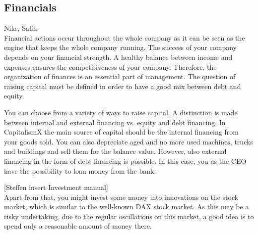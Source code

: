 \subsection{Financials} \label{finance_manual}
Nike, Salih\\

Financial actions occur throughout the whole company as it can be seen as the engine that keeps the whole company running. The success of your company depends on your financial strength. A healthy balance between income and expenses ensures the competitiveness of your company. Therefore, the organization of finances is an essential part of management. The question of raising capital must be defined in order to have a good mix between debt and equity.

You can choose from a variety of ways to raise capital. A distinction is made between internal and external financing vs. equity and debt financing.
In CapitalismX the main source of capital should be the internal financing from your goods sold. You can also depreciate aged and no more used machines, trucks and buildings and sell them for the balance value. However, also external financing in the form of debt financing is possible. In this case, you as the CEO have the possibility to loan money from the bank.

[Steffen insert Investment manual]\\
Apart from that, you might invest some money into innovations on the stock market, which is similar to the well-known DAX stock market. As this may be a risky undertaking, due to the regular oscillations on this market, a good idea is to spend only a reasonable amount of money there. 

